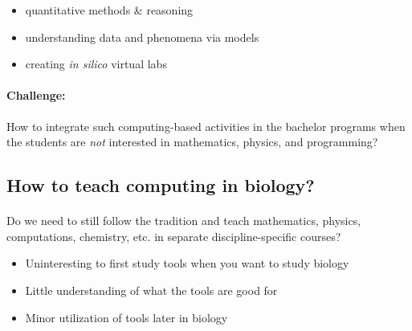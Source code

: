 \documentclass[%
twoside,                 %
final,                   %
10pt]{article}
\begin{document}
\begin{itemize}
  \item quantitative methods {\&} reasoning

  \item understanding data and phenomena via models

  \item creating \emph{in silico} virtual labs
\end{itemize}

\noindent




\paragraph{Challenge:}
How to integrate such computing-based activities in the bachelor programs
when the students are \emph{not} interested in mathematics, physics, and
programming?



\subsection{How to teach computing in biology?}


\paragraph{}
Do we need to still follow the tradition and teach mathematics, physics, computations, chemistry, etc. in separate discipline-specific courses?

\begin{itemize}
  \item Uninteresting to first study tools when you want to study biology

  \item Little understanding of what the tools are good for

  \item Minor utilization of tools later in biology
\end{itemize}

\noindent




\end{document}
